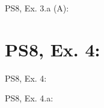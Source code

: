 \begin{frame}{PS8, Ex. 3.a (A): }
  \begin{multicols}{2}
    \vfill\null\columnbreak
    \vfill\null
  \end{multicols}
\end{frame}



\section{PS8, Ex. 4: }

\begin{frame}{PS8, Ex. 4: }
  \begin{multicols}{2}
    \vfill\null\columnbreak
    \vfill\null
  \end{multicols}
\end{frame}

\begin{frame}{PS8, Ex. 4.a: }
  \begin{multicols}{2}
    \vfill\null\columnbreak
    \vfill\null\null
  \end{multicols}
\end{frame}
